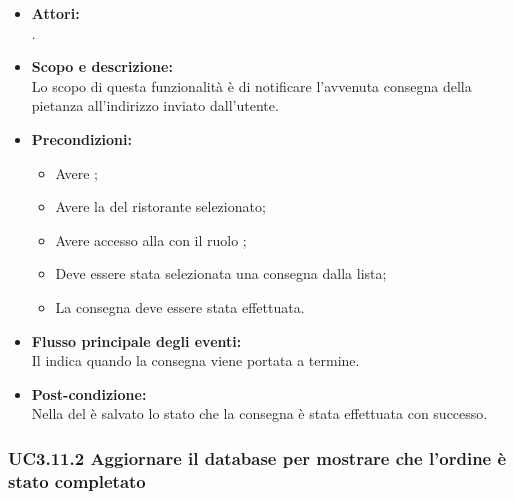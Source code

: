 \begin{itemize}
	\item \textbf{Attori:}
	\\.
	\item \textbf{Scopo e descrizione:} 
	\\Lo scopo di questa funzionalità è di notificare l'avvenuta consegna della pietanza all'indirizzo inviato dall'utente.
	\item \textbf{Precondizioni:}
	\begin{itemize}
		\item Avere ;
		\item Avere la  del ristorante selezionato;
		\item Avere accesso alla  con il ruolo ;
		\item Deve essere stata selezionata una consegna dalla lista;
		\item La consegna deve essere stata effettuata.
	\end{itemize}
	\item \textbf{Flusso principale degli eventi:}
	\\Il {} indica quando la consegna viene portata a termine.
	\item \textbf{Post-condizione:}
	\\Nella {} del  è salvato lo stato che la consegna è stata effettuata con successo.
\end{itemize}

\subsubsection{UC3.11.2 Aggiornare il database per mostrare che l'ordine è stato completato} \label{UC3.11.2}

